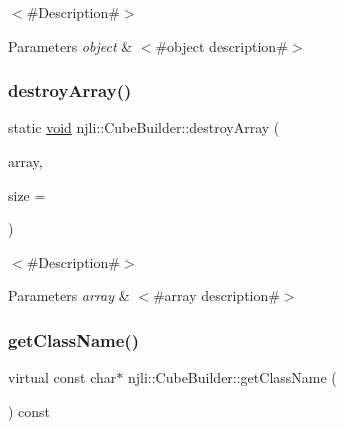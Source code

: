 $<$\#\+Description\#$>$


\begin{DoxyParams}{Parameters}
{\em object} & $<$\#object description\#$>$ \\
\hline
\end{DoxyParams}
\mbox{\label{classnjli_1_1_cube_builder_af06e4e2f2eda9d656e115cde6bcc52a4}} 
\subsubsection{\texorpdfstring{destroy\+Array()}{destroyArray()}}
{\footnotesize\ttfamily static \mbox{\hyperlink{_thread_8h_af1e856da2e658414cb2456cb6f7ebc66}{void}} njli\+::\+Cube\+Builder\+::destroy\+Array (\begin{DoxyParamCaption}\item[{\mbox{\hyperlink{classnjli_1_1_cube_builder}{Cube\+Builder}} $\ast$$\ast$}]{array,  }\item[{const \mbox{\hyperlink{_util_8h_a10e94b422ef0c20dcdec20d31a1f5049}{u32}}}]{size = {} }\end{DoxyParamCaption})\hspace{0.3cm}{\ttfamily [static]}}

$<$\#\+Description\#$>$


\begin{DoxyParams}{Parameters}
{\em array} & $<$\#array description\#$>$ \\
\hline
\end{DoxyParams}
\mbox{\label{classnjli_1_1_cube_builder_a18e74517d40f424ab5eced76cc03940a}} 
\subsubsection{\texorpdfstring{get\+Class\+Name()}{getClassName()}}
{\footnotesize\ttfamily virtual const char$\ast$ njli\+::\+Cube\+Builder\+::get\+Class\+Name (\begin{DoxyParamCaption}{ }\end{DoxyParamCaption}) const\hspace{0.3cm}{\ttfamily [virtual]}}

